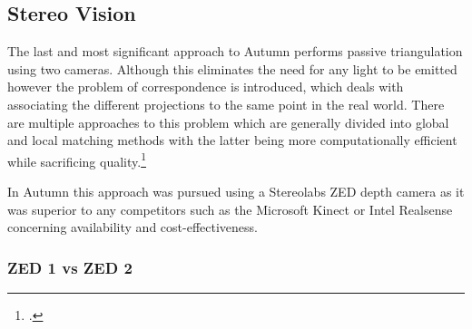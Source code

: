 \subsection{Stereo Vision}
The last and most significant approach to Autumn performs passive triangulation using two cameras. Although this eliminates the need for any light to be emitted however the problem of correspondence is introduced, which deals with associating the different projections to the same point in the real world. There are multiple approaches to this problem which are generally divided into global and local matching methods with the latter being more computationally efficient while sacrificing quality.\footcite{do2019review}

In Autumn this approach was pursued using a Stereolabs ZED depth camera as it was superior to any competitors such as the Microsoft Kinect or Intel Realsense concerning availability and cost-effectiveness. 

\subsubsection{ZED 1 vs ZED 2}





\filbreak